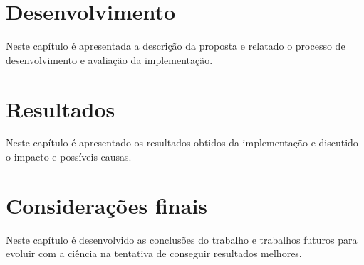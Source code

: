 \documentclass[
	12pt,				%
	openright,			%
	twoside,			%
	a4paper,			%
	english,			%
	french,				%
	spanish,			%
	brazil				%
	]{abntex2}
\begin{document}


% 





% 









\chapter{Desenvolvimento}

Neste capítulo é apresentada a descrição da proposta e relatado o processo de
desenvolvimento e avaliação da implementação.





\chapter{Resultados}

Neste capítulo é apresentado os resultados obtidos da implementação e discutido o  impacto e possíveis causas.





\chapter{Considerações finais}

Neste capítulo é desenvolvido as conclusões do trabalho e trabalhos futuros para evoluir com a ciência na tentativa de conseguir resultados melhores.





% 

\end{document}
